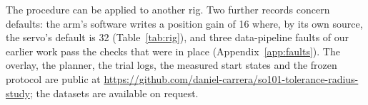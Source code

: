 The procedure can be applied to another rig.
Two further records concern defaults: the arm's software writes a position gain of 16 where, by its own source, the servo's default is 32 (Table~\ref{tab:rig}), and three data-pipeline faults of our earlier work pass the checks that were in place (Appendix~\ref{app:faults}). %
The overlay, the planner, the trial logs, the measured start states and the frozen protocol are public at \url{https://github.com/daniel-carrera/so101-tolerance-radius-study}; the datasets are available on request. %
